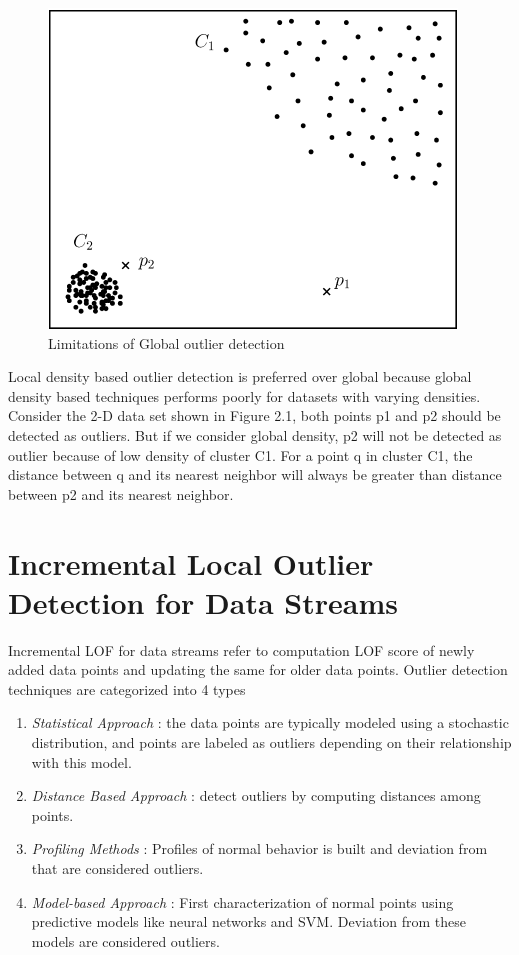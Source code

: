 		\begin{figure}[H]
		\centering
		\includegraphics{chap01/localvsglobal.png}
		\caption{Limitations of Global outlier detection}
	\end{figure}
	
	
	
	\par 
	Local density based outlier detection is preferred over global because global density based techniques performs poorly for datasets with varying densities.
	Consider the 2-D data set shown in Figure 2.1, both points p1 and p2 should be detected as outliers. But if we consider global density, p2 will not be detected as outlier because of low density of cluster C1. For a point q in cluster C1, the distance between q and its nearest neighbor will always be greater than distance between p2 and its nearest neighbor.
	


	
	
	\section{Incremental Local Outlier Detection for Data Streams}
	Incremental LOF for data streams refer to computation LOF score of newly added data points and updating the same for older data points. Outlier detection techniques are categorized into 4 types \cite{f}
	
	\begin{enumerate}
		\item \textit{Statistical Approach} : the data points are typically modeled using a stochastic distribution, and points are labeled as outliers depending on their relationship with this model.
		
		\item \textit{Distance Based Approach} : detect outliers by computing distances among points.
		
		\item \textit{Profiling Methods} : Profiles of normal behavior is built and deviation from that are considered outliers.
		
		\item \textit{Model-based Approach} : First characterization of normal points using predictive models like neural networks and SVM. Deviation from these models are considered outliers.
		
		
	\end{enumerate}
	

